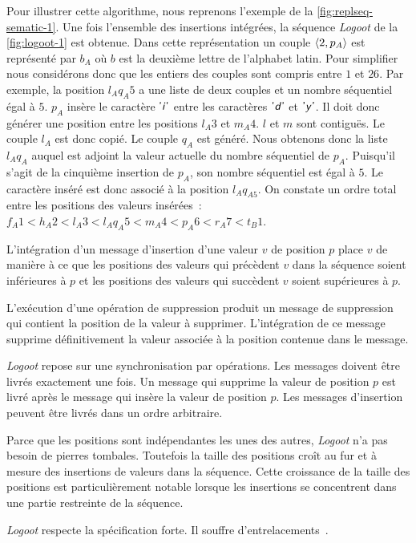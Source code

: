 Pour illustrer cette algorithme, nous reprenons l'exemple de la \autoref{fig:replseq-sematic-1}.
Une fois l'ensemble des insertions intégrées, la séquence \emph{Logoot} de la \autoref{fig:logoot-1} est obtenue.
Dans cette représentation un couple $\tuple*{2, p_A}$ est représenté par $b_A$ où $b$ est la deuxième lettre de l'alphabet latin.
Pour simplifier nous considérons donc que les entiers des couples sont compris entre $1$ et $26$.
Par exemple, la position $l_A q_A5$ a une liste de deux couples et un nombre séquentiel égal à $5$.
$p_A$ insère le caractère $\textsf{'\textit{i}'}$ entre les caractères $\textsf{'\textit{d}'}$ et $\textsf{'\textit{y}'}$.
Il doit donc générer une position entre les positions $l_A3$ et $m_A4$.
$l$ et $m$ sont contiguës.
Le couple $l_A$ est donc copié.
Le couple $q_A$ est généré.
Nous obtenons donc la liste $l_A q_A$ auquel est adjoint la valeur actuelle du nombre séquentiel de $p_A$.
Puisqu'il s'agit de la cinquième insertion de $p_A$, son nombre séquentiel est égal à $5$.
Le caractère inséré est donc associé à la position $l_A q_{A5}$.
On constate un ordre total entre les positions des valeurs insérées~: $f_A1 < h_A2 < l_A3 < l_A q_A5 < m_A4 < p_A6 < r_A7 < t_B1$.

L'intégration d'un message d'insertion d'une valeur $v$ de position $p$ place $v$ de manière à ce que les positions des valeurs qui précèdent $v$ dans la séquence soient inférieures à $p$ et les positions des valeurs qui succèdent $v$ soient supérieures à $p$.

L'exécution d'une opération de suppression produit un message de suppression qui contient la position de la valeur à supprimer.
L'intégration de ce message supprime définitivement la valeur associée à la position contenue dans le message.

\emph{Logoot} repose sur une synchronisation par opérations.
Les messages doivent être livrés exactement une fois.
Un message qui supprime la valeur de position $p$ est livré après le message qui insère la valeur de position $p$.
Les messages d'insertion peuvent être livrés dans un ordre arbitraire.

Parce que les positions sont indépendantes les unes des autres, \emph{Logoot} n'a pas  besoin de pierres tombales.
Toutefois la taille des positions croît au fur et à mesure des insertions de valeurs dans la séquence.
Cette croissance de la taille des positions est particulièrement notable lorsque les insertions se concentrent dans une partie restreinte de la séquence.

\emph{Logoot} respecte la spécification forte.
Il souffre d'entrelacements~\autocite{kleppmann2019_interleaving}.


